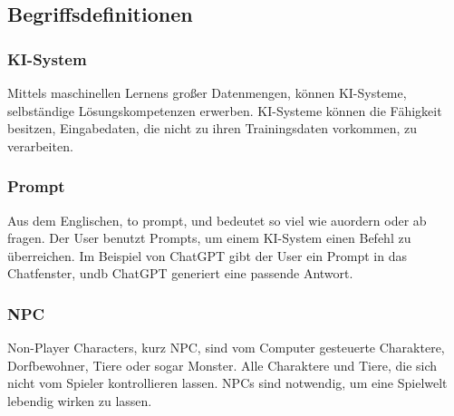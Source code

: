 \documentclass[12pt,a4paper,bibliography=totocnumbered,listof=totocnumbered]{scrartcl}
\begin{document}
\subsection{Begriffsdefinitionen}%

\subsubsection{KI-System}
Mittels maschinellen Lernens großer Datenmengen, können KI-Systeme, selbständige  Lösungskompetenzen erwerben. KI-Systeme können die Fähigkeit besitzen, Eingabedaten, die nicht zu ihren Trainingsdaten vorkommen, zu verarbeiten.

\subsubsection{Prompt}
Aus dem Englischen, to prompt, und bedeutet so viel wie auordern oder ab fragen. Der User benutzt Prompts, um einem KI-System einen Befehl zu überreichen. Im Beispiel von ChatGPT gibt der User ein Prompt in das Chatfenster, undb ChatGPT generiert eine passende Antwort.

\subsubsection{NPC}
Non-Player Characters, kurz NPC, sind vom Computer gesteuerte Charaktere, Dorfbewohner, Tiere oder sogar Monster. Alle Charaktere und Tiere, die sich nicht vom Spieler kontrollieren lassen. NPCs sind notwendig, um eine Spielwelt lebendig wirken zu lassen.
\end{document}
